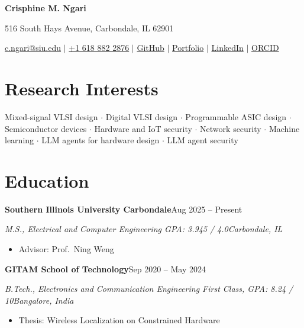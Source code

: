 \documentclass[10.5pt,letterpaper]{article}
\newcommand{\entry}[2]{\textbf{#1}\hfill #2\par\nopagebreak}
\newcommand{\subentry}[2]{\textit{#1}\hfill \textit{#2}\par\nopagebreak\vspace{0.15em}\nopagebreak}
\begin{document}
\begin{center}
  {\LARGE\bfseries Crisphine M. Ngari}\par
  \vspace{0.15em}
  516 South Hays Avenue, Carbondale, IL 62901\par
  \vspace{0.12em}
  \href{mailto:c.ngari@siu.edu}{c.ngari@siu.edu}
  \enspace$\mid$\enspace
  \href{tel:+16188822876}{+1 618 882 2876}
  \enspace$\mid$\enspace
  \href{https://github.com/crisphinen}{GitHub}
  \enspace$\mid$\enspace
  \href{https://crisphinen.github.io/}{Portfolio}
  \enspace$\mid$\enspace
  \href{https://www.linkedin.com/in/crisphine-ngari-a73016204/}{LinkedIn}
  \enspace$\mid$\enspace
  \href{https://orcid.org/0009-0005-7834-5521}{ORCID}
\end{center}
\vspace{-0.7em}

\section*{Research Interests}
Mixed-signal VLSI design $\cdot$ Digital VLSI design $\cdot$
Programmable ASIC design $\cdot$ Semiconductor devices $\cdot$ Hardware and IoT security $\cdot$ Network security $\cdot$
Machine learning $\cdot$ LLM agents for hardware design $\cdot$ LLM agent security

\section*{Education}
\entry{Southern Illinois University Carbondale}{Aug 2025 -- Present}
\subentry{M.S., Electrical and Computer Engineering \quad GPA: 3.945 / 4.0}{Carbondale, IL}
\begin{itemize}
  \item Advisor: Prof.\ Ning Weng
\end{itemize}
\vspace{0.25em}
\entry{GITAM School of Technology}{Sep 2020 -- May 2024}
\subentry{B.Tech., Electronics and Communication Engineering \quad First Class, GPA: 8.24 / 10}{Bangalore, India}
\begin{itemize}
  \item Thesis: Wireless Localization on Constrained Hardware
\end{itemize}
\end{document}
